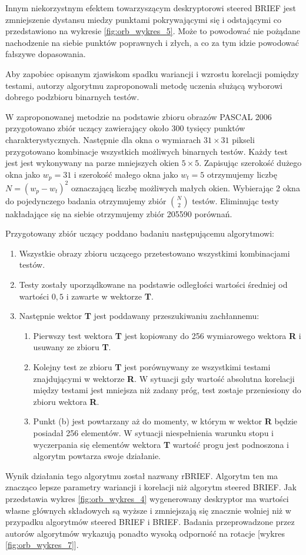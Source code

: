 Innym niekorzystnym efektem towarzyszącym deskryptorowi steered BRIEF jest zmniejszenie dystansu miedzy punktami pokrywającymi się i odstającymi co przedstawiono na wykresie \ref{fig:orb_wykres_5}. Może to powodować nie pożądane nachodzenie na siebie punktów poprawnych i złych, a co za tym idzie powodować fałszywe dopasowania.

Aby zapobiec opisanym zjawiskom spadku wariancji i wzrostu korelacji pomiędzy testami, autorzy algorytmu zaproponowali metodę uczenia służącą wyborowi dobrego podzbioru binarnych testów.

W zaproponowanej metodzie na podstawie zbioru obrazów PASCAL 2006 \cite{pascal} przygotowano zbiór uczący zawierający około 300 tysięcy punktów charakterystycznych. Następnie dla okna o wymiarach $31\times31$ pikseli przygotowano kombinacje wszystkich możliwych binarnych testów. Każdy test jest jest wykonywany na parze mniejszych okien $5\times5$. Zapisując szerokość dużego okna jako $w_p = 31$ i szerokość małego okna jako $w_t = 5$ otrzymujemy liczbę $N = (w_p - w_t)^2$ oznaczającą liczbę możliwych małych okien. Wybierając 2 okna do pojedynczego badania otrzymujemy zbiór ${N\choose 2}$ testów. Eliminując testy nakładające się na siebie otrzymujemy zbiór 205590 porównań.

Przygotowany zbiór uczący poddano badaniu następującemu algorytmowi:
\begin{enumerate}
\item Wszystkie obrazy zbioru uczącego przetestowano wszystkimi kombinacjami testów.
\item Testy zostały uporządkowane na podstawie odległości wartości średniej od wartości $0,5$ i zawarte w wektorze \textbf{T}.
\item Następnie wektor \textbf{T} jest poddawany przeszukiwaniu zachłannemu:
\begin{enumerate}
\item Pierwszy test wektora \textbf{T} jest kopiowany do 256 wymiarowego wektora \textbf{R} i usuwany ze zbioru \textbf{T}.
\item Kolejny test ze zbioru \textbf{T} jest porównywany ze wszystkimi testami znajdującymi w wektorze \textbf{R}. W sytuacji gdy wartość absolutna korelacji między testami jest mniejsza niż zadany próg, test zostaje przeniesiony do zbioru wektora \textbf{R}.
\item Punkt (b) jest powtarzany aż do momenty, w którym w wektor \textbf{R} będzie posiadał 256 elementów. W sytuacji niespełnienia warunku stopu i wyczerpania się elementów wektora \textbf{T} wartość progu jest podnoszona i algorytm powtarza swoje działanie.
\end{enumerate}
\end{enumerate}
Wynik działania tego algorytmu został nazwany rBRIEF. Algorytm ten ma znacząco lepsze parametry wariancji i korelacji niż algorytm steered BRIEF. Jak przedstawia wykres \ref{fig:orb_wykres_4} wygenerowany deskryptor ma wartości własne głównych składowych są wyższe i zmniejszają się znacznie wolniej niż w przypadku algorytmów steered BRIEF i BRIEF. Badania przeprowadzone przez autorów algorytmów wykazują ponadto wysoką odporność na rotacje [wykres \ref{fig:orb_wykres_7}].
